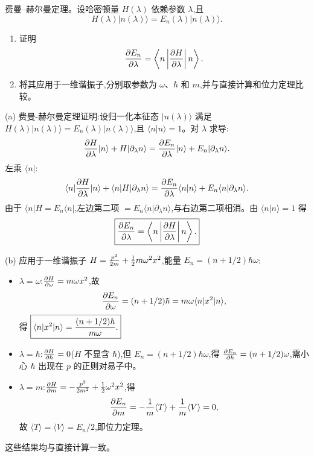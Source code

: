 \begin{question}
费曼--赫尔曼定理。设哈密顿量 $H(\lambda)$ 依赖参数 $\lambda$,且
\[
H(\lambda)|n(\lambda)\rangle=E_n(\lambda)|n(\lambda)\rangle.
\]
\begin{enumerate}
\item 证明
\[
{\partial E_n\over\partial\lambda}=\left\langle n\left|{\partial H\over\partial\lambda}\right|n\right\rangle.
\]
\item 将其应用于一维谐振子,分别取参数为 $\omega$、$\hbar$ 和 $m$,并与直接计算和位力定理比较。
\end{enumerate}
\begin{solution}
(a) 费曼-赫尔曼定理证明:设归一化本征态 $|n(\lambda)\rangle$ 满足 $H(\lambda)|n(\lambda)\rangle = E_n(\lambda)|n(\lambda)\rangle$,且 $\langle n|n\rangle=1$。对 $\lambda$ 求导:
\[
{\partial H\over\partial\lambda}|n\rangle + H|\partial_\lambda n\rangle
= {\partial E_n\over\partial\lambda}|n\rangle + E_n|\partial_\lambda n\rangle.
\]
左乘 $\langle n|$:
\[
\langle n|{\partial H\over\partial\lambda}|n\rangle + \langle n|H|\partial_\lambda n\rangle
= {\partial E_n\over\partial\lambda}\langle n|n\rangle + E_n\langle n|\partial_\lambda n\rangle.
\]
由于 $\langle n|H = E_n\langle n|$,左边第二项 $=E_n\langle n|\partial_\lambda n\rangle$,与右边第二项相消。由 $\langle n|n\rangle=1$ 得
\[
\boxed{{\partial E_n\over\partial\lambda} = \left\langle n\left|{\partial H\over\partial\lambda}\right|n\right\rangle.}
\]

(b) 应用于一维谐振子 $H={p^2\over2m}+{1\over2}m\omega^2x^2$,能量 $E_n=(n+1/2)\hbar\omega$:
\begin{itemize}
\item $\lambda=\omega$:${\partial H\over\partial\omega}=m\omega x^2$,故
  \[
  {\partial E_n\over\partial\omega} = (n+1/2)\hbar = m\omega\langle n|x^2|n\rangle,
  \]
  得 $\boxed{\langle n|x^2|n\rangle = {(n+1/2)\hbar\over m\omega}.}$
\item $\lambda=\hbar$:${\partial H\over\partial\hbar}=0$($H$ 不显含 $\hbar$),但 $E_n=(n+1/2)\hbar\omega$,得 ${\partial E_n\over\partial\hbar}=(n+1/2)\omega$,需小心 $\hbar$ 出现在 $p$ 的正则对易子中。
\item $\lambda=m$:${\partial H\over\partial m} = -{p^2\over2m^2} + {1\over2}\omega^2 x^2$,得
  \[
  {\partial E_n\over\partial m} = -{1\over m}\langle T\rangle + {1\over m}\langle V\rangle = 0,
  \]
  故 $\langle T\rangle = \langle V\rangle = E_n/2$,即位力定理。
\end{itemize}
这些结果均与直接计算一致。
\end{solution}
\end{question}

